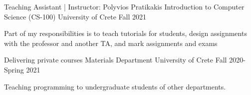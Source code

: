 


\begin{cventries}

  \cventry
    {Teaching Assistant | Instructor: Polyvios Pratikakis} %
    {Introduction to Computer Science (CS-100)} %
    {University of Crete} %
    {Fall 2021} %
    {
      \begin{cvitems} %
        \item{Part of my responsibilities is to teach tutorials for
            students, design assignments with the professor and
              another TA, and mark assignments and exams}
      \end{cvitems}
    }


  \cventry
    {Delivering private courses} %
    {Materials Department} %
    {University of Crete} %
    {Fall 2020-Spring 2021} %
    {
      \begin{cvitems}
        \item{Teaching programming to undergraduate students of other departments.}
      \end{cvitems}
    }

\end{cventries}
